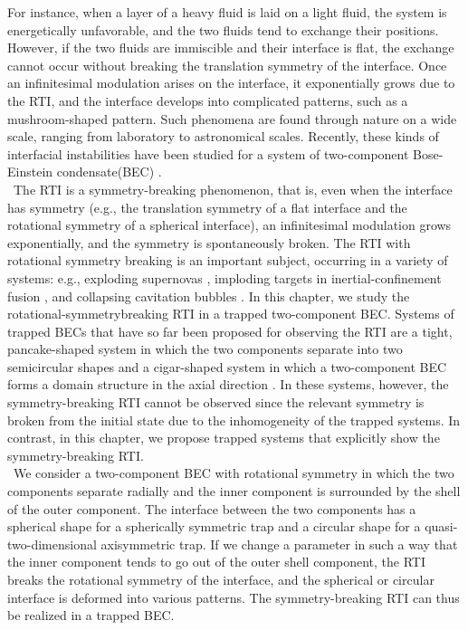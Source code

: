 \documentclass[12pt,a4paper]{report} %
\begin{document}
For instance, when a layer of a heavy fluid is laid on a light fluid,
the system is energetically unfavorable, and the two fluids tend to exchange their positions.
However, if the two fluids are immiscible and their interface is flat,
the exchange cannot occur without breaking the translation symmetry of the interface.
Once an infinitesimal modulation arises on the interface,
it exponentially grows due to the RTI,
and the interface develops into complicated patterns,
such as a mushroom-shaped pattern.
Such phenomena are found through nature on a wide scale,
ranging from laboratory to astronomical scales.
Recently, these kinds of interfacial instabilities have been
studied for a system of two-component Bose-Einstein condensate(BEC) \cite{62}\cite{63}\cite{64}\cite{65}.
\\
\ The RTI is a symmetry-breaking phenomenon, that is,
even when the interface has symmetry
(e.g., the translation symmetry of a flat interface and the rotational symmetry
of a spherical interface), an infinitesimal modulation grows
exponentially, and the symmetry is spontaneously broken.
The RTI with rotational symmetry breaking is an important subject,
occurring in a variety of systems:
e.g., exploding supernovas \cite{66}\cite{67}\cite{68}, 
imploding targets in inertial-confinement fusion \cite{69},
and collapsing cavitation bubbles \cite{70} \cite{71}.
In this chapter, we study the rotational-symmetrybreaking RTI
in a trapped two-component BEC.
Systems of trapped BECs that have so far been proposed for observing the RTI
are a tight,
pancake-shaped system in which the two components separate into two semicircular shapes \cite{62}
and a cigar-shaped system in which a two-component BEC forms a domain
structure in the axial direction \cite{63}.
In these systems, however, the symmetry-breaking RTI cannot be observed since 
the relevant symmetry is broken from the initial state due to the inhomogeneity of the trapped systems.
In contrast, in this chapter, we propose trapped systems that explicitly show the symmetry-breaking RTI.
\\
\ We consider a two-component BEC with rotational symmetry in which the two components separate radially and
the inner component is surrounded by the shell of the outer component.
The interface between the two components has a spherical shape for a spherically symmetric trap
and a circular shape for a quasi-two-dimensional axisymmetric trap.
If we change a parameter in such a way that the inner component tends to go out of
the outer shell component,
the RTI breaks the rotational symmetry of the interface, and the spherical or
circular interface is deformed into various patterns.
The symmetry-breaking RTI can thus be realized in a trapped BEC.
\end{document}
